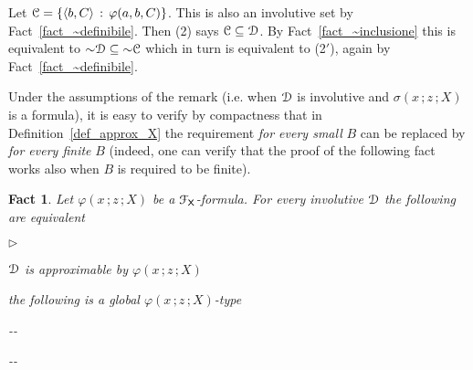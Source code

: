\documentclass{amsproc}
\makeatletter
\newcommand{\mylabel}[1]{{#1}\hfill}
\renewenvironment{itemize}
  {\begin{list}{$\triangleright$}{%
  \setlength{\parskip}{0mm}
  \setlength{\topsep}{.1\baselineskip}
  \setlength{\rightmargin}{0mm}
  \setlength{\listparindent}{0mm}
  \setlength{\itemindent}{0mm}
  \setlength{\labelwidth}{3ex}
  \setlength{\itemsep}{.1\baselineskip}
  \setlength{\parsep}{.1\baselineskip}
  \setlength{\partopsep}{0mm}
  \setlength{\labelsep}{1ex}
  \setlength{\leftmargin}{\labelwidth+\labelsep}
  \let\makelabel\mylabel}}{%
\end{list}}
\newcounter{thm}
\theoremstyle{mio}
\newtheorem{fact}[thm]{Fact}\tcolorboxenvironment{fact}{mythm}
\providecommand{\proofNameStyle}{\bfseries}
\renewenvironment{proof}[1][\proofname]{\par
  \pushQED{\qed}%
  \normalfont%
  \trivlist
  \item[\hskip\labelsep
        \proofNameStyle
    #1\@addpunct{.}]\ignorespaces
}{%
  \popQED\endtrivlist\@endpefalse
}
\makeatother
\begin{document}
\begin{proof}
  Let ${\EuScript C}=\{\langle b,C\rangle\,:\,\varphi(a,b,C)\}$.
  This is also an involutive set by Fact~\ref{fact_~definibile}.
  Then (2) says ${\EuScript C}\subseteq{\EuScript D}$.
  By Fact~\ref{fact_~inclusione} this is equivalent to ${\sim}{\EuScript D}\subseteq{\sim}{\EuScript C}$ which in turn is equivalent to (2$'$), again by Fact~\ref{fact_~definibile}.
\end{proof}

Under the assumptions of the remark (i.e. when ${\EuScript D}$ is involutive and $\sigma(x\,;z\,;X)$ is a formula), it is easy to verify by compactness that in Definition~\ref{def_approx_X} the requirement \textit{for every small\/} $B$ can be replaced by \textit{for every finite\/} $B$ (indeed, one can verify that the proof of the following fact works also when $B$ is required to be finite).

\begin{fact}
  Let $\varphi(x\,;z\,;X)$ be a ${\EuScript F}_{\sf X}$-formula.
  For every involutive ${\EuScript D}$ the following are equivalent
  \begin{itemize}
    \item [1.] ${\EuScript D}$ is approximable by $\varphi(x\,;z\,;X)$
    \item [2.] the following is a global $\varphi(x\,;z\,;X)$-type\smallskip
    
    \noindent\kern-\kern-
    \smallskip

    \noindent\kern-\kern-
  
  \end{itemize}
\end{fact}
\end{document}
